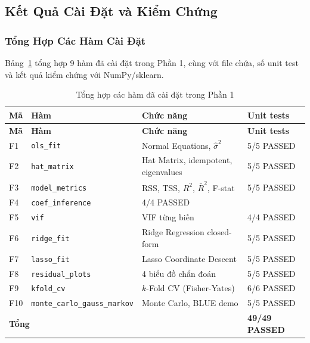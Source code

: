 ﻿\subsection{Kết Quả Cài Đặt và Kiểm Chứng}


\subsubsection{Tổng Hợp Các Hàm Cài Đặt}

Bảng~\ref{tab:functions} tổng hợp 9 hàm đã cài đặt trong Phần 1, cùng
với file chứa, số unit test và kết quả kiểm chứng với NumPy/sklearn.

\begin{longtable}{@{}p{}p{}p{}
                    p{}@{}}
\caption{Tổng hợp các hàm đã cài đặt trong Phần 1}
\label{tab:functions} \\
\hline
\textbf{Mã} & \textbf{Hàm} & \textbf{Chức năng} & \textbf{Unit tests} \\
\hline
\endfirsthead
\hline
\textbf{Mã} & \textbf{Hàm} & \textbf{Chức năng} & \textbf{Unit tests} \\
\hline
\endhead
F1 & \texttt{ols\_fit} & Normal Equations, $\hat{\sigma}^2$ & 5/5 PASSED \\
F2 & \texttt{hat\_matrix} & Hat Matrix, idempotent, eigenvalues & 5/5 PASSED \\
F3 & \texttt{model\_metrics} & RSS, TSS, $R^2$, $\bar{R}^2$, F-stat & 5/5 PASSED \\
F4 & \texttt{coef\_inference} & 4/4 PASSED \\
F5 & \texttt{vif} &  VIF từng biến & 4/4 PASSED \\
F6 & \texttt{ridge\_fit} & Ridge Regression closed-form & 5/5 PASSED \\
F7 & \texttt{lasso\_fit} & Lasso Coordinate Descent & 5/5 PASSED \\
F8 & \texttt{residual\_plots} & 4 biểu đồ chẩn đoán & 5/5 PASSED \\
F9 & \texttt{kfold\_cv} & $k$-Fold CV (Fisher-Yates) & 6/6 PASSED \\
F10 & \texttt{monte\_carlo\_gauss\_markov} & Monte Carlo, BLUE demo & 5/5 PASSED \\
\hline
\multicolumn{3}{l}{\textbf{Tổng}} & \textbf{49/49 PASSED} \\
\hline
\end{longtable}


